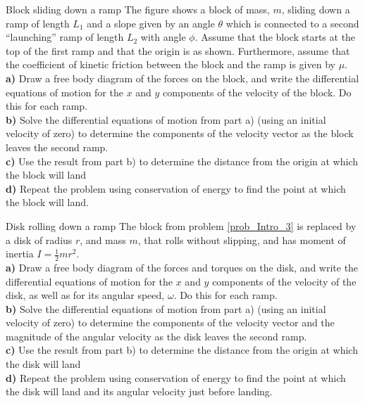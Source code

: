 \begin{problem}{Block sliding down a ramp}
\label{prob_Intro_3}
The figure shows a block of mass, $m$, sliding down a ramp of length $L_1$ and a slope given by an angle $\theta$ which is connected to a second ``launching'' ramp of length $L_2$ with angle $\phi$. Assume that the block starts at the top of the first ramp and that the origin is as shown. Furthermore, assume that the coefficient of kinetic friction between the block and the ramp is given by $\mu$.
\\
\textbf{a)} Draw a free body diagram of the forces on the block, and write the differential equations of motion for the $x$ and $y$ components of the velocity of the block. Do this for each ramp.\\
\textbf{b)} Solve the differential equations of motion from part a) (using an initial velocity of zero) to determine the components of the velocity vector as the block leaves the second ramp.\\
\textbf{c)} Use the result from part b) to determine the distance from the origin at which the block will land\\
\textbf{d)} Repeat the problem using conservation of energy to find the point at which the block will land.
\end{problem}
%
\begin{problem}{Disk rolling down a ramp}
\label{prob_Intro_4}
The block from problem \ref{prob_Intro_3} is replaced by a disk of radius $r$, and mass $m$, that rolls without slipping, and has moment of inertia $I=\frac{1}{2}mr^2$.\\
\textbf{a)} Draw a free body diagram of the forces and torques on the disk, and write the differential equations of motion for the $x$ and $y$ components of the velocity of the disk, as well as for its angular speed, $\omega$. Do this for each ramp.\\
\textbf{b)} Solve the differential equations of motion from part a) (using an initial velocity of zero) to determine the components of the velocity vector and the magnitude of the angular velocity as the disk leaves the second ramp.\\
\textbf{c)} Use the result from part b) to determine the distance from the origin at which the disk will land\\
\textbf{d)} Repeat the problem using conservation of energy to find the point at which the disk will land and its angular velocity just before landing.
\end{problem}
